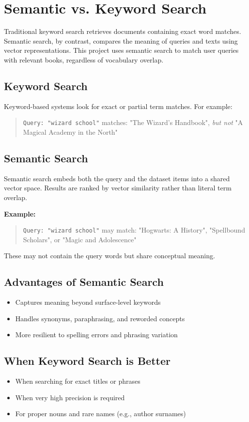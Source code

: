 \chapter{Semantic vs. Keyword Search}
\label{appendix:semantic-vs-keyword}

Traditional keyword search retrieves documents containing exact word matches. Semantic search, by contrast, compares the meaning of queries and texts using vector representations. This project uses semantic search to match user queries with relevant books, regardless of vocabulary overlap.

\section*{Keyword Search}
Keyword-based systems look for exact or partial term matches. For example:
\begin{quote}
\texttt{Query: "wizard school"} \rightarrow matches: "The Wizard's Handbook", \textit{but not} "A Magical Academy in the North"
\end{quote}

\section*{Semantic Search}
Semantic search embeds both the query and the dataset items into a shared vector space. Results are ranked by vector similarity rather than literal term overlap.

\textbf{Example:}
\begin{quote}
\texttt{Query: "wizard school"} \rightarrow may match: "Hogwarts: A History", "Spellbound Scholars", or "Magic and Adolescence"
\end{quote}

These may not contain the query words but share conceptual meaning.

\section*{Advantages of Semantic Search}
\begin{itemize}
  \item Captures meaning beyond surface-level keywords
  \item Handles synonyms, paraphrasing, and reworded concepts
  \item More resilient to spelling errors and phrasing variation
\end{itemize}

\section*{When Keyword Search is Better}
\begin{itemize}
  \item When searching for exact titles or phrases
  \item When very high precision is required
  \item For proper nouns and rare names (e.g., author surnames)
\end{itemize}

